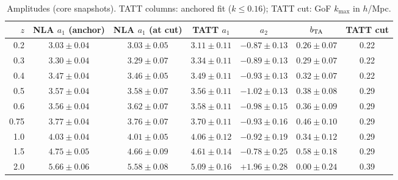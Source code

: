 \documentclass[11pt]{article}
\begin{document}
\begin{table}[H]\centering\small
\begin{tabular}{r|cc|cccc}
\toprule
$z$ & NLA $a_1$ (anchor) & NLA $a_1$ (at cut) & TATT $a_1$ & $a_2$ & $b_{\rm TA}$ & TATT cut\\
\midrule
0.2 & $3.03\pm0.04$ & $3.03\pm0.05$ & $3.11\pm0.11$ & $-0.87\pm0.13$ & $0.26\pm0.07$ & 0.22\\
0.3 & $3.30\pm0.04$ & $3.29\pm0.07$ & $3.34\pm0.11$ & $-0.89\pm0.13$ & $0.29\pm0.07$ & 0.22\\
0.4 & $3.47\pm0.04$ & $3.46\pm0.05$ & $3.49\pm0.11$ & $-0.93\pm0.13$ & $0.32\pm0.07$ & 0.22\\
0.5 & $3.57\pm0.04$ & $3.58\pm0.07$ & $3.56\pm0.11$ & $-1.02\pm0.13$ & $0.38\pm0.08$ & 0.29\\
0.6 & $3.56\pm0.04$ & $3.62\pm0.07$ & $3.58\pm0.11$ & $-0.98\pm0.15$ & $0.36\pm0.09$ & 0.29\\
0.75 & $3.77\pm0.04$ & $3.76\pm0.07$ & $3.70\pm0.11$ & $-0.93\pm0.16$ & $0.46\pm0.10$ & 0.29\\
1.0 & $4.03\pm0.04$ & $4.01\pm0.05$ & $4.06\pm0.12$ & $-0.92\pm0.19$ & $0.34\pm0.12$ & 0.29\\
1.5 & $4.75\pm0.05$ & $4.66\pm0.09$ & $4.61\pm0.14$ & $-0.78\pm0.25$ & $0.58\pm0.18$ & 0.29\\
2.0 & $5.66\pm0.06$ & $5.58\pm0.08$ & $5.09\pm0.16$ & $+1.96\pm0.28$ & $0.00\pm0.24$ & 0.39\\
\bottomrule
\end{tabular}
\caption{Amplitudes (core snapshots). TATT columns: anchored fit ($k\le0.16$); TATT cut: GoF $k_{\max}$ in $h$/Mpc.}\label{tab:amp}
\end{table}
\end{document}
